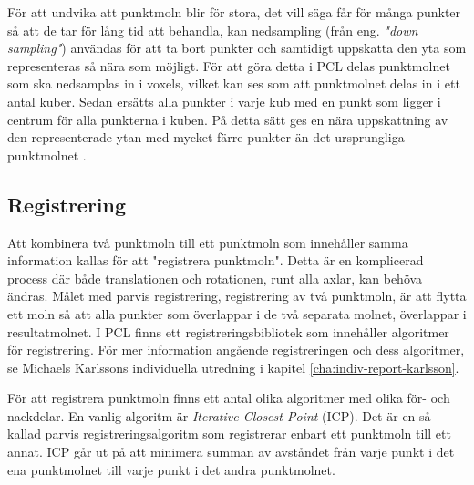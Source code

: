 För att undvika att punktmoln blir för stora, det vill säga får för många punkter så att de tar för lång tid att behandla, kan nedsampling (från eng. \textit{"down sampling"}) användas för att ta bort punkter och samtidigt uppskatta den yta som representeras så nära som möjligt. För att göra detta i PCL delas punktmolnet som ska nedsamplas in i voxels, vilket kan ses som att punktmolnet delas in i ett antal kuber. Sedan ersätts alla punkter i varje kub med en punkt som ligger i centrum för alla punkterna i kuben. På detta sätt ges en nära uppskattning av den representerade ytan med mycket färre punkter än det ursprungliga punktmolnet \cite{voxel_grid}.
 

\subsection{Registrering}
Att kombinera två punktmoln till ett punktmoln som innehåller samma information kallas för att "registrera punktmoln". Detta är en komplicerad process där både translationen och rotationen, runt alla axlar, kan behöva ändras. Målet med parvis registrering, registrering av två punktmoln, är att flytta ett moln så att alla punkter som överlappar i de två separata molnet, överlappar i resultatmolnet. I PCL finns ett registreringsbibliotek som innehåller algoritmer för registrering\cite{pcl_registration}. För mer information angående registreringen och dess algoritmer, se Michaels Karlssons individuella utredning i kapitel \ref{cha:indiv-report-karlsson}. 


För att registrera punktmoln finns ett antal olika algoritmer med olika för- och nackdelar. En vanlig algoritm är \textit{Iterative Closest Point} (ICP). Det är en så kallad parvis registreringsalgoritm som registrerar enbart ett punktmoln till ett annat. ICP går ut på att minimera summan av avståndet från varje punkt i det ena punktmolnet till varje punkt i det andra punktmolnet.

